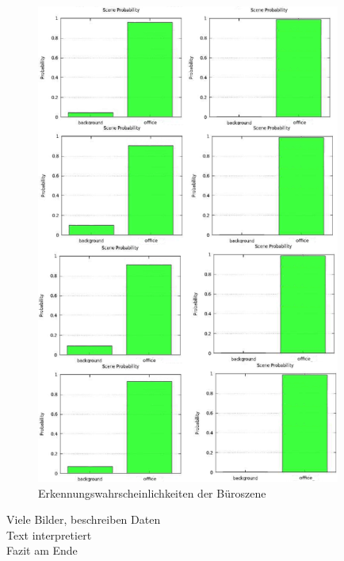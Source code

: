 \begin{figure}
	\centering
	\includegraphics[width=10cm]{bilder/buerowahrscheinlichkeit.pdf}
	\caption{Erkennungswahrscheinlichkeiten der B{\"u}roszene}
	\label{img:buerowahrscheinlichkeit}
\end{figure}
Viele Bilder, beschreiben Daten\\
Text interpretiert\\
Fazit am Ende \\
